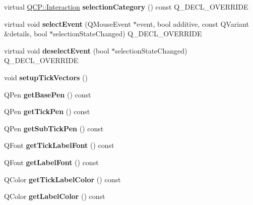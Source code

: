 \begin{DoxyCompactItemize}
\item 
virtual \hyperlink{namespace_q_c_p_a2ad6bb6281c7c2d593d4277b44c2b037}{Q\+C\+P\+::\+Interaction} {\bfseries selection\+Category} () const Q\+\_\+\+D\+E\+C\+L\+\_\+\+O\+V\+E\+R\+R\+I\+DE\hypertarget{class_q_c_p_axis_a54bf731cab5c943ea5bd6914bc561a31}{}\label{class_q_c_p_axis_a54bf731cab5c943ea5bd6914bc561a31}

\item 
virtual void {\bfseries select\+Event} (Q\+Mouse\+Event $\ast$event, bool additive, const Q\+Variant \&details, bool $\ast$selection\+State\+Changed) Q\+\_\+\+D\+E\+C\+L\+\_\+\+O\+V\+E\+R\+R\+I\+DE\hypertarget{class_q_c_p_axis_aceb54231926cc65abecd638b2d125408}{}\label{class_q_c_p_axis_aceb54231926cc65abecd638b2d125408}

\item 
virtual void {\bfseries deselect\+Event} (bool $\ast$selection\+State\+Changed) Q\+\_\+\+D\+E\+C\+L\+\_\+\+O\+V\+E\+R\+R\+I\+DE\hypertarget{class_q_c_p_axis_ad35767b1835603051691885296dee49e}{}\label{class_q_c_p_axis_ad35767b1835603051691885296dee49e}

\item 
void {\bfseries setup\+Tick\+Vectors} ()\hypertarget{class_q_c_p_axis_a57d9e961bae7d62f5b4e1f143e660c78}{}\label{class_q_c_p_axis_a57d9e961bae7d62f5b4e1f143e660c78}

\item 
Q\+Pen {\bfseries get\+Base\+Pen} () const \hypertarget{class_q_c_p_axis_a3eb0681d31baf579bb73b86a0153cb02}{}\label{class_q_c_p_axis_a3eb0681d31baf579bb73b86a0153cb02}

\item 
Q\+Pen {\bfseries get\+Tick\+Pen} () const \hypertarget{class_q_c_p_axis_a7f503910be40fb1717e1635be3ef17e1}{}\label{class_q_c_p_axis_a7f503910be40fb1717e1635be3ef17e1}

\item 
Q\+Pen {\bfseries get\+Sub\+Tick\+Pen} () const \hypertarget{class_q_c_p_axis_ab4f7e60a40eb051c775afcaeab895c85}{}\label{class_q_c_p_axis_ab4f7e60a40eb051c775afcaeab895c85}

\item 
Q\+Font {\bfseries get\+Tick\+Label\+Font} () const \hypertarget{class_q_c_p_axis_aef30b66668986523225089a67280ec7a}{}\label{class_q_c_p_axis_aef30b66668986523225089a67280ec7a}

\item 
Q\+Font {\bfseries get\+Label\+Font} () const \hypertarget{class_q_c_p_axis_ab0768eb2879efb202645d19ff789e63e}{}\label{class_q_c_p_axis_ab0768eb2879efb202645d19ff789e63e}

\item 
Q\+Color {\bfseries get\+Tick\+Label\+Color} () const \hypertarget{class_q_c_p_axis_a0f8583f7ac24ccc70d39fdd2389cad6e}{}\label{class_q_c_p_axis_a0f8583f7ac24ccc70d39fdd2389cad6e}

\item 
Q\+Color {\bfseries get\+Label\+Color} () const \hypertarget{class_q_c_p_axis_a42bd69b9e9c571f13624079be18ccdc1}{}\label{class_q_c_p_axis_a42bd69b9e9c571f13624079be18ccdc1}

\end{DoxyCompactItemize}
